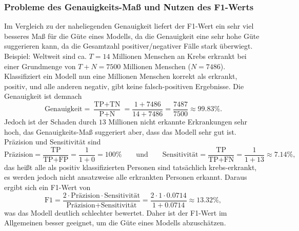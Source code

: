 			\subsubsection{Probleme des Genauigkeits-Maß und Nutzen des F1-Werts}
				\label{subsubsec:accuracyProblems}

				Im Vergleich zu der naheliegenden Genauigkeit liefert der F1-Wert ein sehr viel besseres Maß für die Güte eines Modells, da die Genauigkeit eine sehr hohe Güte suggerieren kann, da die Gesamtzahl positiver/negativer Fälle stark überwiegt. Beispiel: Weltweit sind ca. \(T = 14\) Millionen Menschen an Krebs erkrankt bei einer Grundmenge von \(T + N = 7500\) Millionen Menschen (\dh \(N = 7486\)). Klassifiziert ein Modell nun eine Millionen Menschen korrekt als erkrankt, \dh positiv, und alle anderen negativ, gibt keine falsch-positiven Ergebnisse. Die Genauigkeit ist demnach
				\begin{equation}
					\text{Genauigkeit}
						= \frac{\text{TP} + \text{TN}}{\text{P} + \text{N}}
						= \frac{1 + 7486}{14 + 7486}
						= \frac{7487}{7500}
						\approx 99.83\%.
				\end{equation}
				Jedoch ist der Schaden durch \(13\) Millionen nicht erkannte Erkrankungen sehr hoch, das Genauigkeits-Maß suggeriert aber, dass das Modell sehr gut ist. Präzision und Sensitivität sind
				\begin{equation}
					\text{Präzision}
						= \frac{\text{TP}}{\text{TP} + \text{FP}}
						= \frac{1}{1 + 0} = 100\%
					\qquad\text{und}\qquad
					\text{Sensitivität}
						= \frac{\text{TP}}{\text{TP} + \text{FN}}
						= \frac{1}{1 + 13} \approx 7.14\%,
				\end{equation}
				das heißt alle als positiv klassifizierten Personen sind tatsächlich krebs-erkrankt, es werden jedoch nicht ansatzweise alle erkrankten Personen erkannt. Daraus ergibt sich ein F1-Wert von
				\begin{equation}
					\text{F1}
						= \frac{2 \cdot \text{Präzision} \cdot \text{Sensitivität}}{\text{Präzision} + \text{Sensitivität}}
						= \frac{2 \cdot 1 \cdot 0.0714}{1 + 0.0714}
						\approx 13.32\%,
				\end{equation}
				was das Modell deutlich schlechter bewertet. Daher ist der F1-Wert im Allgemeinen besser geeignet, um die Güte eines Modells abzuschätzen.

